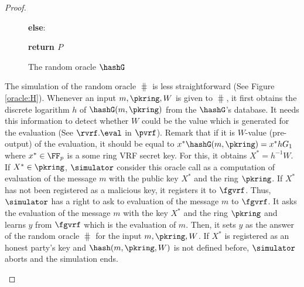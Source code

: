 \begin{proof}
\begin{itemize}
\begin{figure}
{{					\textbf{else}:
					
					
					
					\textbf{return $ P $}
					
			}}	
			\caption{The random oracle $ \hashG $}
			\label{oracle:Hg}
		\end{figure}
	
		The simulation of the random oracle $ \hash $ is less straightforward (See Figure \ref{oracle:H}). Whenever an input $ m, \pkring, W $ is given to $ \hash $, it first obtains the discrete logarithm $ h $ of $ \hashG(m, \pkring) $ from the $ \hashG $'s database. It needs this information to detect whether $ W $ could be the value which is generated for the evaluation (See $ \rvrf.\eval $ in $ \pvrf $). Remark that if it is $ W $-value (pre-output) of the evaluation, it should be equal to $ x^*\hashG(m, \pkring)= x^*hG_1 $  where $ x^* \in \FF_p$ is a some ring VRF secret key. For this, it obtains $ X^* = h^{-1}W $. If $ X^* \in \pkring $, $ \simulator $ consider this oracle call as  a computation of evaluation of the  message $ m $ with the public key $ X^* $ and the ring $ \pkring $.
		If $ X^* $ has not been registered as a malicious key, it registers it to $ \fgvrf $. Thus, $ \simulator $ has a right to ask to evaluation of the message $ m $ to $ \fgvrf $. It asks the evaluation of the message $ m $ with the key $ X^* $ and the ring $ \pkring $ and learns $ y $ from $ \fgvrf $ which is the evaluation of $ m $. Then, it sets $ y $ as the answer of the random oracle $ \hash $  for the input $ m, \pkring, W $. If $ X^* $ is registered as an honest party's key and $ \hash(m,\pkring,W) $ is not defined before, $ \simulator $ aborts and the simulation ends.
		
		\begin{figure}
			\centering
			
			\noindent{}
\end{figure}
\end{itemize}
\end{proof}
